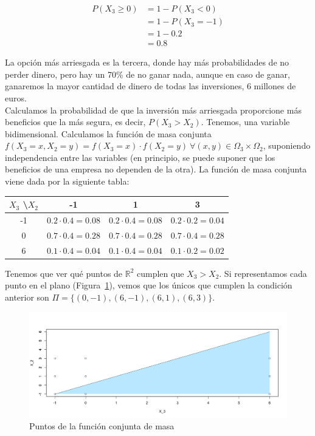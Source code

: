 \documentclass[12pt,a4paper,twoside,openright,titlepage,final]{article}
\begin{document}
\begin{align*}
P(X_3 \geq 0) & = 1 - P(X_3 < 0) \\ & = 1 - P(X_3 = -1) \\ & = 1 - 0.2 \\ & = 0.8 
\end{align*}

La opción más arriesgada es la tercera, donde hay más probabilidades de no perder dinero, pero hay un 70\% de no ganar nada, aunque en caso de ganar, ganaremos la mayor cantidad de dinero de todas las inversiones, 6 millones de euros.\\

Calculamos la probabilidad de que la inversión más arriesgada proporcione más beneficios que la más segura, es decir, $P(X_3 > X_2)$. Tenemos, una variable bidimensional. Calculamos la función de masa conjunta $f(X_3 = x, X_2 = y) = f(X_3 = x) \cdot f(X_2 = y) \ \forall (x,y) \in \Omega_3 \times \Omega_2$, suponiendo independencia entre las variables (en principio, se puede suponer que los beneficios de una empresa no dependen de la otra). La función de masa conjunta viene dada por la siguiente tabla:

\begin{table}[htbp!]
\centering
\begin{tabular}{cccc}
\hline
$X_3$ \textbackslash $X_2$ & -1                     & 1                      & 3                      \\ \hline
-1                         & $0.2 \cdot 0.4 = 0.08$ & $0.2 \cdot 0.4 = 0.08$ & $0.2 \cdot 0.2 = 0.04$ \\ \hline
0                          & $0.7 \cdot 0.4 = 0.28$ & $0.7 \cdot 0.4 = 0.28$ & $0.7 \cdot 0.4 = 0.28$ \\ \hline
6                          & $0.1 \cdot 0.4 = 0.04$ & $0.1 \cdot 0.4 = 0.04$ & $0.1 \cdot 0.2 = 0.02$ \\ \hline
\end{tabular}
\end{table}

Tenemos que ver qué puntos de $\mathbb{R}^2$ cumplen que $X_3 > X_2$. Si representamos cada punto en el plano (Figura~\ref{fig:puntos_discreta}), vemos que los únicos que cumplen la condición anterior son $\Pi = \{(0,-1), (6,-1), (6,1), (6,3)\}$.\\

\begin{figure}[tbph!]
\centering
\includegraphics[width=0.9\linewidth]{imagenes/puntos_discreta}
\caption{Puntos de la función conjunta de masa}
\label{fig:puntos_discreta}
\end{figure}
\end{document}
